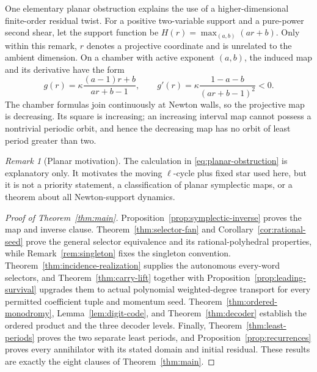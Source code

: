 \documentclass[11pt,letterpaper]{article}
\theoremstyle{definition}
\theoremstyle{remark}
\newtheorem{remark}[theorem]{Remark}
\numberwithin{equation}{section}
\begin{document}
One elementary planar obstruction explains the use of a higher-dimensional
finite-order residual twist.  For a positive two-variable support and a
pure-power second shear, let the support function be
\(H(r)=\max_{(a,b)}(ar+b)\).  Only within this remark, \(r\) denotes a
projective coordinate and is unrelated to the ambient dimension.  On a
chamber with active exponent \((a,b)\), the induced map and its derivative
have the form
\begin{equation}
 g(r)=\kappa\frac{(a-1)r+b}{ar+b-1},
 \qquad
 g'(r)=\kappa\frac{1-a-b}{(ar+b-1)^2}<0.
 \label{eq:planar-obstruction}
\end{equation}
The chamber formulas join continuously at Newton walls, so the projective
map is decreasing.  Its square is increasing; an increasing interval map
cannot possess a nontrivial periodic orbit, and hence the decreasing map has
no orbit of least period greater than two.

\begin{remark}[Planar motivation]
\label{rem:planar-obstruction}
The calculation in \eqref{eq:planar-obstruction} is explanatory only.  It
motivates the moving \(\ell\)-cycle plus fixed star used here, but it is not
a priority statement, a classification of planar symplectic maps, or a
theorem about all Newton-support dynamics.
\end{remark}

\begin{proof}[Proof of Theorem~\ref{thm:main}]
Proposition~\ref{prop:symplectic-inverse} proves the map and inverse clause.
Theorem~\ref{thm:selector-fan} and
Corollary~\ref{cor:rational-seed} prove the general selector equivalence and
its rational-polyhedral properties, while Remark~\ref{rem:singleton} fixes
the singleton convention.  Theorem~\ref{thm:incidence-realization} supplies
the autonomous every-word selectors, and
Theorem~\ref{thm:carry-lift} together with
Proposition~\ref{prop:leading-survival} upgrades them to actual polynomial
weighted-degree transport for every permitted coefficient tuple and momentum
seed.  Theorem~\ref{thm:ordered-monodromy},
Lemma~\ref{lem:digit-code}, and Theorem~\ref{thm:decoder} establish the
ordered product and the three decoder levels.  Finally,
Theorem~\ref{thm:least-periods} proves the two separate least periods, and
Proposition~\ref{prop:recurrences} proves every annihilator with its stated
domain and initial residual.  These results are exactly the eight clauses of
Theorem~\ref{thm:main}.
\end{proof}
\end{document}
